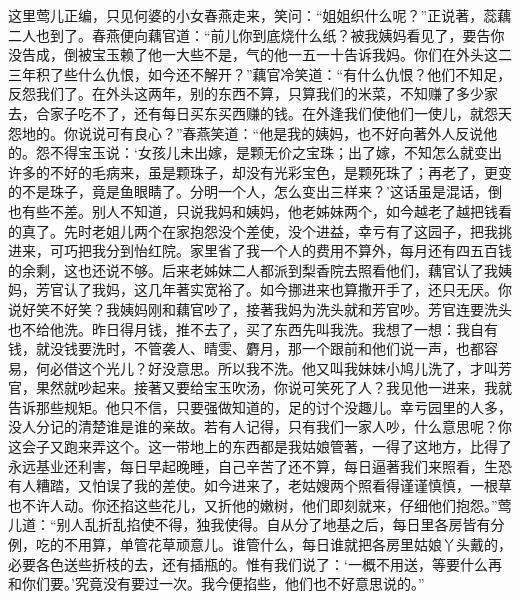 \begin{parag}
    这里莺儿正编，只见何婆的小女春燕走来，笑问：“姐姐织什么呢？”正说著，蕊藕二人也到了。春燕便向藕官道：“前儿你到底烧什么纸？被我姨妈看见了，要告你没告成，倒被宝玉赖了他一大些不是，气的他一五一十告诉我妈。你们在外头这二三年积了些什么仇恨，如今还不解开？”藕官冷笑道：“有什么仇恨？他们不知足，反怨我们了。在外头这两年，别的东西不算，只算我们的米菜，不知赚了多少家去，合家子吃不了，还有每日买东买西赚的钱。在外逢我们使他们一使儿，就怨天怨地的。你说说可有良心？”春燕笑道：“他是我的姨妈，也不好向著外人反说他的。怨不得宝玉说：‘女孩儿未出嫁，是颗无价之宝珠；出了嫁，不知怎么就变出许多的不好的毛病来，虽是颗珠子，却没有光彩宝色，是颗死珠了；再老了，更变的不是珠子，竟是鱼眼睛了。分明一个人，怎么变出三样来？’这话虽是混话，倒也有些不差。别人不知道，只说我妈和姨妈，他老姊妹两个，如今越老了越把钱看的真了。先时老姐儿两个在家抱怨没个差使，没个进益，幸亏有了这园子，把我挑进来，可巧把我分到怡红院。家里省了我一个人的费用不算外，每月还有四五百钱的余剩，这也还说不够。后来老姊妹二人都派到梨香院去照看他们，藕官认了我姨妈，芳官认了我妈，这几年著实宽裕了。如今挪进来也算撒开手了，还只无厌。你说好笑不好笑？我姨妈刚和藕官吵了，接著我妈为洗头就和芳官吵。芳官连要洗头也不给他洗。昨日得月钱，推不去了，买了东西先叫我洗。我想了一想：我自有钱，就没钱要洗时，不管袭人、晴雯、麝月，那一个跟前和他们说一声，也都容易，何必借这个光儿？好没意思。所以我不洗。他又叫我妹妹小鸠儿洗了，才叫芳官，果然就吵起来。接著又要给宝玉吹汤，你说可笑死了人？我见他一进来，我就告诉那些规矩。他只不信，只要强做知道的，足的讨个没趣儿。幸亏园里的人多，没人分记的清楚谁是谁的亲故。若有人记得，只有我们一家人吵，什么意思呢？你这会子又跑来弄这个。这一带地上的东西都是我姑娘管著，一得了这地方，比得了永远基业还利害，每日早起晚睡，自己辛苦了还不算，每日逼著我们来照看，生恐有人糟踏，又怕误了我的差使。如今进来了，老姑嫂两个照看得谨谨慎慎，一根草也不许人动。你还掐这些花儿，又折他的嫩树，他们即刻就来，仔细他们抱怨。”莺儿道：“别人乱折乱掐使不得，独我使得。自从分了地基之后，每日里各房皆有分例，吃的不用算，单管花草顽意儿。谁管什么，每日谁就把各房里姑娘丫头戴的，必要各色送些折枝的去，还有插瓶的。惟有我们说了：‘一概不用送，等要什么再和你们要。’究竟没有要过一次。我今便掐些，他们也不好意思说的。”
\end{parag}


